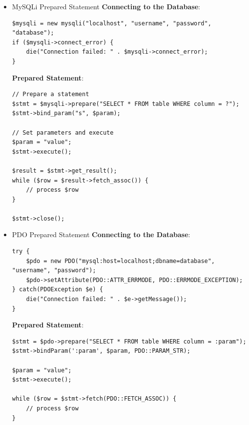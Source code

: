 \documentclass[11pt]{article}
\begin{document}
\begin{itemize}
\item MySQLi Prepared Statement
\label{sec:orgd9664e1}
\textbf{Connecting to the Database}:

\begin{verbatim}
$mysqli = new mysqli("localhost", "username", "password", "database");
if ($mysqli->connect_error) {
    die("Connection failed: " . $mysqli->connect_error);
}
\end{verbatim}

\textbf{Prepared Statement}:

\begin{verbatim}
// Prepare a statement
$stmt = $mysqli->prepare("SELECT * FROM table WHERE column = ?");
$stmt->bind_param("s", $param);

// Set parameters and execute
$param = "value";
$stmt->execute();

$result = $stmt->get_result();
while ($row = $result->fetch_assoc()) {
    // process $row
}

$stmt->close();
\end{verbatim}

\item PDO Prepared Statement
\label{sec:orgd7aefde}
\textbf{Connecting to the Database}:

\begin{verbatim}
try {
    $pdo = new PDO("mysql:host=localhost;dbname=database", "username", "password");
    $pdo->setAttribute(PDO::ATTR_ERRMODE, PDO::ERRMODE_EXCEPTION);
} catch(PDOException $e) {
    die("Connection failed: " . $e->getMessage());
}
\end{verbatim}

\textbf{Prepared Statement}:

\begin{verbatim}
$stmt = $pdo->prepare("SELECT * FROM table WHERE column = :param");
$stmt->bindParam(':param', $param, PDO::PARAM_STR);

$param = "value";
$stmt->execute();

while ($row = $stmt->fetch(PDO::FETCH_ASSOC)) {
    // process $row
}
\end{verbatim}
\end{itemize}
\end{document}
